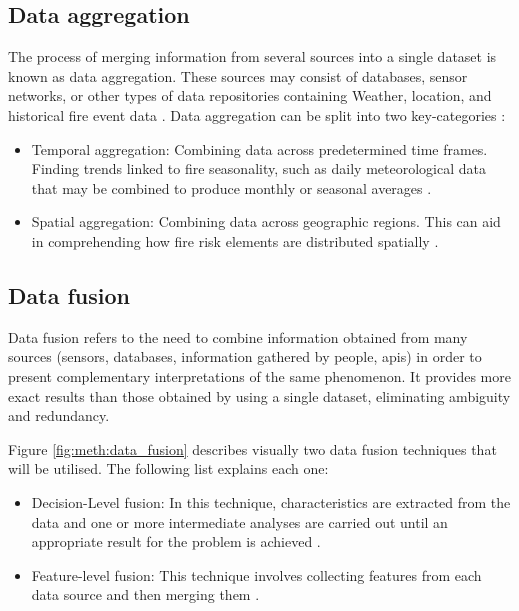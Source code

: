\subsection{Data aggregation}
The process of merging information from several sources into a single dataset is known as data aggregation. These sources may consist of databases, sensor networks, or other types of data repositories containing Weather, location, and historical fire event data \cite{Cai2019}. Data aggregation can be split into two key-categories \cite{papvco2021fusion}:
\begin{itemize}
    \item Temporal aggregation: Combining data across predetermined time frames. Finding trends linked to fire seasonality, such as daily meteorological data that may be combined to produce monthly or seasonal averages \cite{papvco2021fusion}.
    \item Spatial aggregation: Combining data across geographic regions. This can aid in comprehending how fire risk elements are distributed spatially \cite{papvco2021fusion}.
\end{itemize}

\subsection{Data fusion}
\label{data_fusion}
Data fusion refers to the need to combine information obtained from many sources (sensors, databases, information gathered by people, apis) in order to present complementary interpretations of the same phenomenon. It provides more exact results than those obtained by using a single dataset, eliminating ambiguity and redundancy. \cite{CHATZICHRISTOS2022341, LACROIX200375}

Figure \ref{fig:meth:data_fusion} describes visually two data fusion techniques that will be utilised. The following list explains each one:
\begin{itemize}
    \item Decision-Level fusion: In this technique, characteristics are extracted from the data and one or more intermediate analyses are carried out until an appropriate result for the problem is achieved \cite{articleDataFusion}.
    \item Feature-level fusion: This technique involves collecting features from each data source and then merging them \cite{articleDataFusion}.
\end{itemize}

